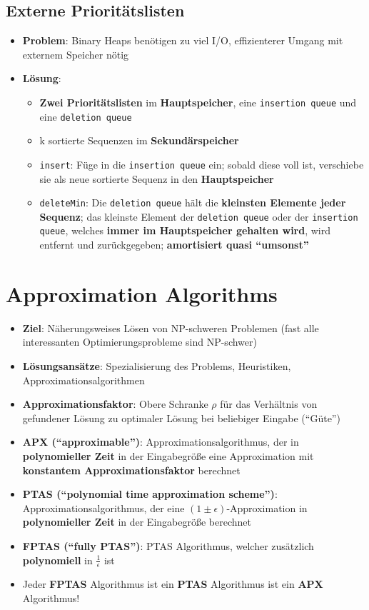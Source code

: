 \documentclass[10pt,a4paper]{article}
\newcommand{\quotestyle}[1]{\enquote{#1}}
\begin{document}
	\subsection{Externe Prioritätslisten}
	\label{ea:sub:externe_prioritaetslisten}
	
	\begin{itemize}
		\item \textbf{Problem}: Binary Heaps benötigen zu viel I/O, effizienterer Umgang mit externem Speicher nötig
		\item \textbf{Lösung}:
		\begin{itemize}
			\item \textbf{Zwei Prioritätslisten} im \textbf{Hauptspeicher}, eine \texttt{insertion queue} und eine \texttt{deletion queue}
			\item k sortierte Sequenzen im \textbf{Sekundärspeicher}
			\item \texttt{insert}: Füge in die \texttt{insertion queue} ein; sobald diese voll ist, verschiebe sie als neue sortierte Sequenz in den \textbf{Hauptspeicher}
			\item \texttt{deleteMin}: Die \texttt{deletion queue} hält die \textbf{kleinsten Elemente jeder Sequenz}; das kleinste Element der \texttt{deletion queue} oder der \texttt{insertion queue}, welches \textbf{immer im Hauptspeicher gehalten wird}, wird entfernt und zurückgegeben; \textbf{amortisiert quasi \quotestyle{umsonst}}
		\end{itemize}
	\end{itemize}

	\newpage
	\section{Approximation Algorithms}
	\label{aa:sec:approximation_algorithms}
	
	\begin{itemize}
		\item \textbf{Ziel}: Näherungsweises Lösen von NP-schweren Problemen (fast alle interessanten Optimierungsprobleme sind NP-schwer)
		\item \textbf{Lösungsansätze}: Spezialisierung des Problems, Heuristiken, Approximationsalgorithmen
		\item \textbf{Approximationsfaktor}: Obere Schranke $\rho$ für das Verhältnis von gefundener Lösung zu optimaler Lösung bei beliebiger Eingabe (\quotestyle{Güte})
		\item \textbf{APX (\quotestyle{approximable})}: Approximationsalgorithmus, der in \textbf{polynomieller Zeit} in der Eingabegröße eine Approximation mit \textbf{konstantem Approximationsfaktor} berechnet
		\item \textbf{PTAS (\quotestyle{polynomial time approximation scheme})}: Approximationsalgorithmus, der eine $(1 \pm \epsilon)$-Approximation in \textbf{polynomieller Zeit} in der Eingabegröße berechnet
		\item \textbf{FPTAS (\quotestyle{fully PTAS})}: PTAS Algorithmus, welcher zusätzlich \textbf{polynomiell} in $\frac{1}{\epsilon}$ ist
		\item Jeder \textbf{FPTAS} Algorithmus ist ein \textbf{PTAS} Algorithmus ist ein \textbf{APX} Algorithmus!
	\end{itemize}
\end{document}
